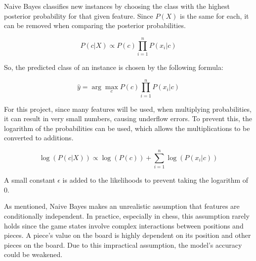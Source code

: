 Naive Bayes classifies new instances by choosing the class with the highest posterior probability for that given feature. Since $P(X)$ is the same for each, it can be removed when comparing the posterior probabilities.

\begin{equation}
    \label{eq:posterior}
    P(c | X) \propto P(c) \prod_{i=1}^{n} P(x_i | c)
\end{equation}

So, the predicted class of an instance is chosen by the following formula:

\begin{equation}
    \label{eq:prediction}
    \hat{y} = \arg\max_{c} P(c) \prod_{i=1}^{n} P(x_i | c)
\end{equation}

For this project, since many features will be used, when multiplying probabilities, it can result in very small numbers, causing underflow errors. To prevent this, the logarithm of the probabilities can be used, which allows the multiplications to be converted to additions.

\begin{equation}
    \label{eq:log}
    \log(P(c | X)) \propto \log(P(c)) + \sum_{i=1}^{n} \log(P(x_i | c))
\end{equation}

A small constant $\epsilon$ is added to the likelihoods to prevent taking the logarithm of 0.

As mentioned, Naive Bayes makes an unrealistic assumption that features are conditionally independent. In practice, especially in chess, this assumption rarely holds since the game states involve complex interactions between positions and pieces. A piece's value on the board is highly dependent on its position and other pieces on the board. Due to this impractical assumption, the model's accuracy could be 
weakened. 






